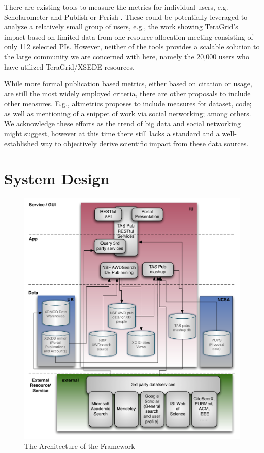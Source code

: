 \documentclass{tex/sig-alternate}
\begin{document}
There are existing tools to measure the metrics for individual users, e.g. Scholarometer \cite{kaur2012scholarometer} and Publish or Perish \cite{www-pop}. These could be potentially leveraged to analyze a relatively small group of users, e.g., the work \cite{bollen2011and} showing TeraGrid's impact based on limited data from one resource allocation meeting consisting of  only 112 selected PIs. 
However, neither of the tools provides a scalable solution to the large community we are concerned with here, namely the 20,000 users who have utilized TeraGrid/XSEDE resources.  
 
While more formal publication based metrics, either based on citation or usage, are still the most widely employed criteria, there are other proposals to include other measures. E.g., altmetrics \cite{www-altmetrics} proposes to include measures for dataset, code; as well as mentioning of a snippet of work via social networking; among others. We acknowledge these efforts as the trend of big data and social networking might suggest, however at this time there still lacks a standard and a well-established way to objectively derive scientific impact from these data sources. 
 
 
% 
 
% 
 
\section{System Design} \label{S:design}
 
\begin{figure}[!htb] 
  \centering 
    \includegraphics[width=1.0\columnwidth]{images/tas-arch.pdf} 
  \caption{The Architecture of the Framework}\label{F:tas-arch} 
\end{figure} 
\end{document}
